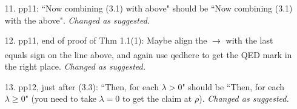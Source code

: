 \documentclass[12pt,a4paper]{amsart}
\numberwithin{equation}{section}
\begin{document}
\begin{itemize}
	{\it Changed as suggested.}
\\
\item[11.]
	pp11: ``Now combining (3.1) with above" should be ``Now combining (3.1) with the above".
	{\it Changed as suggested.}
\\
\newpage
\item[12.]
	pp11, end of proof of Thm 1.1(1): Maybe align the $\xrightarrow[]{}$ with the last equals sign on the line above, and again use qedhere to get the QED mark in the right place.
	{\it Changed as suggested.}
\\
\item[13.]
	pp12, just after (3.3): ``Then, for each $\lambda > 0$" should be ``Then, for each $\lambda \geq 0$" (you need to take $\lambda = 0$ to get the claim at $\rho$).
	{\it Changed as suggested.}
	
	
	
	
	
	
	
	


	
	
	
\end{itemize}
\end{document}
